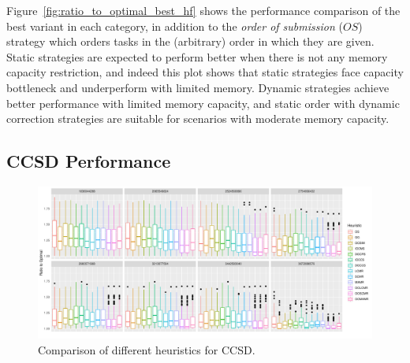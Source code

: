 \documentclass[sigconf]{acmart}
\begin{document}
{		
		Figure~\ref{fig:ratio_to_optimal_best_hf} shows the performance comparison of the best variant in each category, in addition to the \textit{order of submission} ($OS$) strategy which orders tasks in the (arbitrary) order in which they are given. Static strategies are expected to perform better when there is not any memory capacity restriction, and indeed this plot shows that static strategies face capacity bottleneck and underperform with limited memory. Dynamic strategies achieve better performance with limited memory capacity, and static order with dynamic correction strategies are suitable for scenarios with moderate memory capacity.
		
		
		\subsection{CCSD Performance}
		
		
		\begin{figure}[htb]
			\includegraphics[scale=0.5]{./all-binpack/ratio_to_optimal_selected_ccsd.pdf}
			\caption{Comparison of different heuristics for CCSD.}
			\label{fig:ratio_to_optimal_ccsd}
		\end{figure}	
		
}
\end{document}
